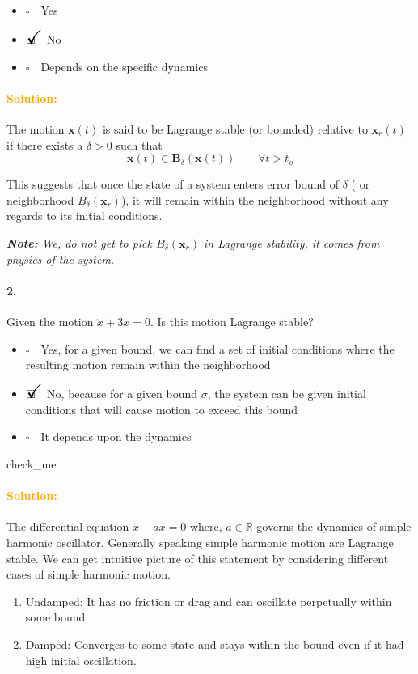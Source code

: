 \documentclass[12pt, a4paper]{article}
\newcommand{\ans}{\item[]$\rlap{\LARGE{\checkmark}}\square\quad$}
\newcommand{\noans}{\item[]$\square\quad$}
\begin{document}
\begin{itemize}
\noans Yes
\ans No
\noans Depends on the specific dynamics
\end{itemize}

\paragraph{\textcolor{orange}{Solution:}}
The motion $\bm{x}(t)$ is said to be Lagrange stable (or bounded) relative to $\bm{x}_{r}(t)$ if there exists a $\delta > 0$ such that 
$$\bm{x}(t) \in \bm{B}_{\delta}(\bm{x}(t)) \quad \quad \forall t > t_{o}$$

This suggests that once the state of a system enters error bound of $\delta$ ( or neighborhood $B_{\delta}(\bm{x}_{r})$), it will remain within the neighborhood without any regards to its initial conditions.  \medskip

\textit{\textbf{Note:} We, do not get to pick $B_{\delta}(\bm{x}_{r})$ in Lagrange stability, it comes from physics of the system.
}
\paragraph{2.}
Given the motion $\ddot{x} + 3x = 0$. Is this motion Lagrange stable?

\begin{itemize}
\noans Yes, for a given bound, we can find a set of initial conditions where the resulting motion remain within the neighborhood
\ans No, because for a given bound $\sigma$, the system can be given initial conditions that will cause motion to exceed this bound
\noans It depends upon the dynamics
\end{itemize}
check\_me

\paragraph{\textcolor{orange}{Solution:}}
The differential equation $\ddot{x} + ax = 0$ where, $a \in \mathbb{R}$ governs the dynamics of simple harmonic oscillator. Generally speaking simple harmonic motion are Lagrange stable. We can get intuitive picture of this statement by considering different cases of simple harmonic motion.
\begin{enumerate}
\item Undamped: It has no friction or drag and can oscillate perpetually within some bound.
\item Damped: Converges to some state and stays within the bound even if it had high initial oscillation. 
\end{enumerate}
\end{document}
